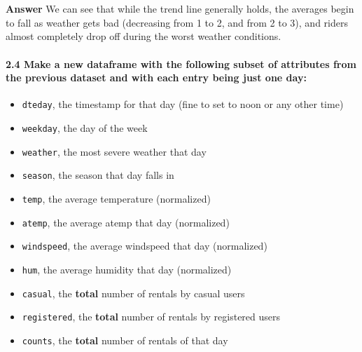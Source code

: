 \documentclass[11pt]{article}
\providecommand{\tightlist}{%
      \setlength{\itemsep}{0pt}\setlength{\parskip}{0pt}}
\begin{document}
    \begin{center}
    \end{center}
    { \hspace*{\fill} \\}
    
    \begin{center}
    \end{center}
    { \hspace*{\fill} \\}
    
    \textbf{Answer} We can see that while the trend line generally holds,
the averages begin to fall as weather gets bad (decreasing from 1 to 2,
and from 2 to 3), and riders almost completely drop off during the worst
weather conditions.

    \paragraph{\texorpdfstring{\textbf{2.4} Make a new dataframe with the
following subset of attributes from the previous dataset and with each
entry being just \textbf{one}
day:}{2.4 Make a new dataframe with the following subset of attributes from the previous dataset and with each entry being just one day:}}\label{make-a-new-dataframe-with-the-following-subset-of-attributes-from-the-previous-dataset-and-with-each-entry-being-just-one-day}

\begin{itemize}
\tightlist
\item
  \texttt{dteday}, the timestamp for that day (fine to set to noon or
  any other time)
\item
  \texttt{weekday}, the day of the week
\item
  \texttt{weather}, the most severe weather that day
\item
  \texttt{season}, the season that day falls in
\item
  \texttt{temp}, the average temperature (normalized)
\item
  \texttt{atemp}, the average atemp that day (normalized)
\item
  \texttt{windspeed}, the average windspeed that day (normalized)
\item
  \texttt{hum}, the average humidity that day (normalized)
\item
  \texttt{casual}, the \textbf{total} number of rentals by casual users
\item
  \texttt{registered}, the \textbf{total} number of rentals by
  registered users
\item
  \texttt{counts}, the \textbf{total} number of rentals of that day
\end{itemize}
\end{document}
